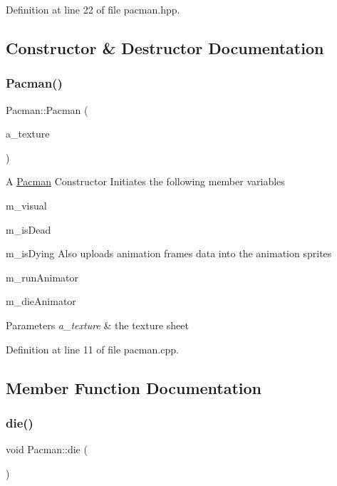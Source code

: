 Definition at line 22 of file pacman.\+hpp.



\subsection{Constructor \& Destructor Documentation}
\mbox{\label{class_pacman_a7be693fb4bf4dc49ede1f022e79022e0}} 
\subsubsection{\texorpdfstring{Pacman()}{Pacman()}}
{\footnotesize\ttfamily Pacman\+::\+Pacman (\begin{DoxyParamCaption}\item[{sf\+::\+Texture \&}]{a\+\_\+texture }\end{DoxyParamCaption})}

A \hyperlink{class_pacman}{Pacman} Constructor Initiates the following member variables
\begin{DoxyItemize}
\item m\+\_\+visual
\item m\+\_\+is\+Dead
\item m\+\_\+is\+Dying Also uploads animation frames data into the animation sprites
\item m\+\_\+run\+Animator
\item m\+\_\+die\+Animator
\end{DoxyItemize}


\begin{DoxyParams}{Parameters}
{\em a\+\_\+texture} & the texture sheet \\
\hline
\end{DoxyParams}


Definition at line 11 of file pacman.\+cpp.



\subsection{Member Function Documentation}
\mbox{\label{class_pacman_a880f3f899b2f2d1ee9969fa049f7289d}} 
\subsubsection{\texorpdfstring{die()}{die()}}
{\footnotesize\ttfamily void Pacman\+::die (\begin{DoxyParamCaption}{ }\end{DoxyParamCaption})}

